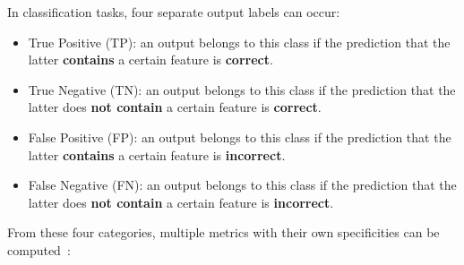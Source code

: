 \setlength{\marginparwidth}{3cm}\leavevmode {}In classification tasks, four separate output labels can occur:
\begin{itemize}
\item True Positive (TP):  an output belongs to this class if the prediction that the latter \textbf{contains} a certain feature is \textbf{correct}.
\item True Negative (TN): an output belongs to this class if the prediction that the latter does \textbf{not contain} a certain feature is \textbf{correct}.
\item False Positive (FP): an output belongs to this class if the prediction that the latter \textbf{contains} a certain feature is \textbf{incorrect}.
\item False Negative (FN): an output belongs to this class if the prediction that the latter does \textbf{not contain} a certain feature is \textbf{incorrect}.
\end{itemize}
From these four categories, multiple metrics with their own specificities can be computed~\cite{25}:
